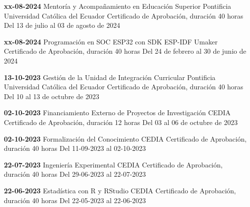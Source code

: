 \begin{levent}
    \cvevent
	{\textbf{xx-08-2024}}
	{Mentoría y Acompañamiento en Educación Superior}
	{Pontificia Universidad Católica del Ecuador}
	{Certificado de Aprobación, duración 40 horas}
	{Del 13 de julio al 03 de agosto de 2024}
\end{levent}


\begin{devent}
    \cvevent
	{\textbf{xx-08-2024}}
	{Programación en SOC ESP32 con SDK ESP-IDF}
	{Umaker}
	{Certificado de Aprobación, duración 40 horas}
	{Del 24 de febrero al 30 de junio de 2024}
\end{devent}


\begin{levent}
    \cvevent
	{\textbf{13-10-2023}}
	{Gestión de la Unidad de Integración Curricular}
	{Pontificia Universidad Católica del Ecuador}
	{Certificado de Aprobación, duración 40 horas}
	{Del 10 al 13 de octubre de 2023}
\end{levent}

\begin{devent}
    \cvevent
	{\textbf{02-10-2023}}
	{Financiamiento Externo de Proyectos de Investigación}
	{CEDIA}
	{Certificado de Aprobación, duración 12 horas}
	{Del 03 al 06 de octubre de 2023}
\end{devent}


\begin{levent}
    \cvevent
	{\textbf{02-10-2023}}
	{Formalización del Conocimiento}
	{CEDIA}
	{Certificado de Aprobación, duración 40 horas}
	{Del 11-09-2023 al 02-10-2023}
\end{levent}

\begin{devent}
    \cvevent
	{\textbf{22-07-2023}}
	{Ingeniería Experimental}
	{CEDIA}
	{Certificado de Aprobación, duración 40 horas}
	{Del 29-06-2023 al 22-07-2023}
\end{devent}

\begin{levent}
    \cvevent
	{\textbf{22-06-2023}}
	{Estadística con R y RStudio}
	{CEDIA}
	{Certificado de Aprobación, duración 40 horas}
	{Del 22-05-2023 al 22-06-2023}
\end{levent}

